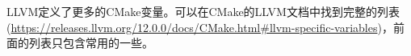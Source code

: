 LLVM定义了更多的CMake变量。可以在CMake的LLVM文档中找到完整的列表 (\url{https://releases.llvm.org/12.0.0/docs/CMake.html\#llvm-specific-variables})，前面的列表只包含常用的一些。\par













































